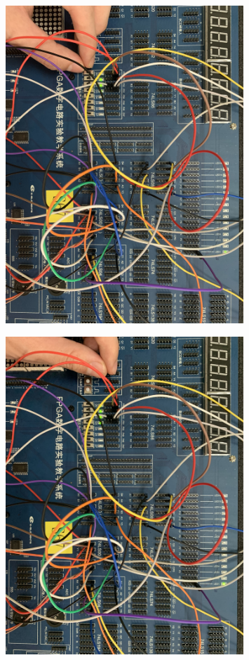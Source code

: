 \documentclass[UTF8, a4paper, 11pt]{article}
\begin{document}
\begin{figure}[H]
    \centering
    \includegraphics[width=0.8\textwidth]{1110.JPG}
\end{figure}
\begin{figure}[H]
    \centering
    \includegraphics[width=0.8\textwidth]{1111.JPG}
\end{figure}
\end{document}
